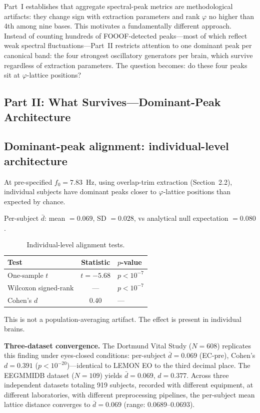 \documentclass[11pt,a4paper]{article}
\newcommand{\phisym}{\varphi}
\newcommand{\fzero}{f_0}
\begin{document}
Part~I establishes that aggregate spectral-peak metrics are methodological artifacts: they change sign with extraction parameters and rank $\phisym$ no higher than 4th among nine bases. This motivates a fundamentally different approach. Instead of counting hundreds of FOOOF-detected peaks---most of which reflect weak spectral fluctuations---Part~II restricts attention to one dominant peak per canonical band: the four strongest oscillatory generators per brain, which survive regardless of extraction parameters. The question becomes: do these four peaks sit at $\phisym$-lattice positions?


\subsection*{Part II: What Survives---Dominant-Peak Architecture}

\subsection{Dominant-peak alignment: individual-level architecture}
\label{sec:dominant_peak}

At pre-specified $\fzero = 7.83$~Hz, using overlap-trim extraction (Section~2.2), individual subjects have dominant peaks closer to $\phisym$-lattice positions than expected by chance.

Per-subject $\bar{d}$: mean $= 0.069$, SD $= 0.028$, vs analytical null expectation $= 0.080$.

\begin{table}[H]
\centering
\caption{Individual-level alignment tests.}
\begin{tabular}{lcl}
\toprule
Test & Statistic & $p$-value \\
\midrule
One-sample $t$ & $t = -5.68$ & $p < 10^{-7}$ \\
Wilcoxon signed-rank & --- & $p < 10^{-7}$ \\
Cohen's $d$ & $0.40$ & --- \\
\bottomrule
\end{tabular}
\end{table}

This is not a population-averaging artifact. The effect is present in individual brains.

\textbf{Three-dataset convergence.} The Dortmund Vital Study ($N = 608$) replicates this finding under eyes-closed conditions: per-subject $\bar{d} = 0.069$ (EC-pre), Cohen's $d = 0.391$ ($p < 10^{-20}$)---identical to LEMON EO to the third decimal place. The EEGMMIDB dataset ($N = 109$) yields $\bar{d} = 0.069$, $d = 0.377$. Across three independent datasets totaling 919 subjects, recorded with different equipment, at different laboratories, with different preprocessing pipelines, the per-subject mean lattice distance converges to $\bar{d} = 0.069$ (range: 0.0689--0.0693).
\end{document}
